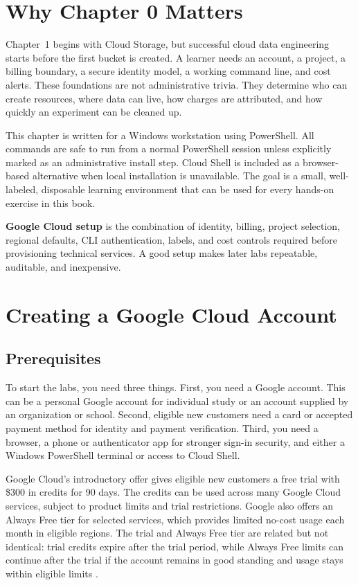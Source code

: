 \section{Why Chapter 0 Matters}
Chapter~1 begins with Cloud Storage, but successful cloud data engineering starts before the first bucket is created. A learner needs an account, a project, a billing boundary, a secure identity model, a working command line, and cost alerts. These foundations are not administrative trivia. They determine who can create resources, where data can live, how charges are attributed, and how quickly an experiment can be cleaned up.

This chapter is written for a Windows workstation using PowerShell. All commands are safe to run from a normal PowerShell session unless explicitly marked as an administrative install step. Cloud Shell is included as a browser-based alternative when local installation is unavailable. The goal is a small, well-labeled, disposable learning environment that can be used for every hands-on exercise in this book.

\begin{definitionbox}
\textbf{Google Cloud setup} is the combination of identity, billing, project selection, regional defaults, CLI authentication, labels, and cost controls required before provisioning technical services. A good setup makes later labs repeatable, auditable, and inexpensive.
\end{definitionbox}

\section{Creating a Google Cloud Account}

\subsection{Prerequisites}
To start the labs, you need three things. First, you need a Google account. This can be a personal Google account for individual study or an account supplied by an organization or school. Second, eligible new customers need a card or accepted payment method for identity and payment verification. Third, you need a browser, a phone or authenticator app for stronger sign-in security, and either a Windows PowerShell terminal or access to Cloud Shell.

Google Cloud's introductory offer gives eligible new customers a free trial with \$300 in credits for 90 days. The credits can be used across many Google Cloud services, subject to product limits and trial restrictions. Google also offers an Always Free tier for selected services, which provides limited no-cost usage each month in eligible regions. The trial and Always Free tier are related but not identical: trial credits expire after the trial period, while Always Free limits can continue after the trial if the account remains in good standing and usage stays within eligible limits \cite{googlecloudfreeprogram}.

